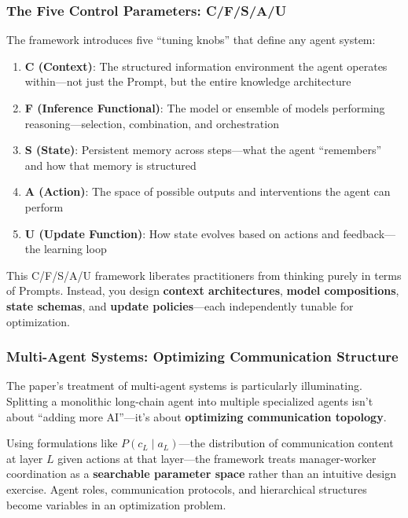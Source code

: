 \subsubsection{The Five Control Parameters: C/F/S/A/U}

The framework introduces five ``tuning knobs'' that define any agent system:

\begin{enumerate}
\item \textbf{C (Context)}: The structured information environment the agent operates within—not just the Prompt, but the entire knowledge architecture
\item \textbf{F (Inference Functional)}: The model or ensemble of models performing reasoning—selection, combination, and orchestration
\item \textbf{S (State)}: Persistent memory across steps—what the agent ``remembers'' and how that memory is structured
\item \textbf{A (Action)}: The space of possible outputs and interventions the agent can perform
\item \textbf{U (Update Function)}: How state evolves based on actions and feedback—the learning loop
\end{enumerate}

This C/F/S/A/U framework liberates practitioners from thinking purely in terms of Prompts. Instead, you design \textbf{context architectures}, \textbf{model compositions}, \textbf{state schemas}, and \textbf{update policies}—each independently tunable for optimization.

\subsubsection{Multi-Agent Systems: Optimizing Communication Structure}

The paper's treatment of multi-agent systems is particularly illuminating. Splitting a monolithic long-chain agent into multiple specialized agents isn't about ``adding more AI''—it's about \textbf{optimizing communication topology}.

Using formulations like $P(c_L \mid a_L)$—the distribution of communication content at layer $L$ given actions at that layer—the framework treats manager-worker coordination as a \textbf{searchable parameter space} rather than an intuitive design exercise. Agent roles, communication protocols, and hierarchical structures become variables in an optimization problem.

